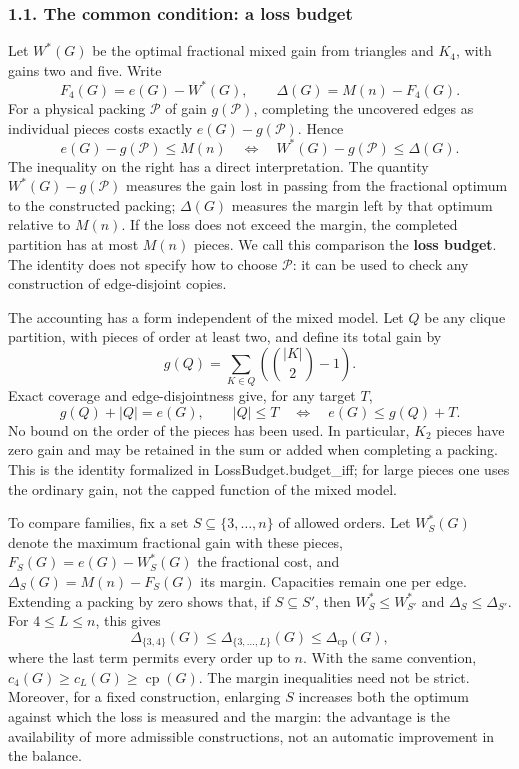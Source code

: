 \documentclass[english,11pt,a4paper]{article}
\begin{document}
\subsubsection{1.1. The common condition: a loss budget}\label{the-common-condition-a-loss-budget}

Let \(W^*(G)\) be the optimal fractional mixed gain from triangles and \(K_4\), with gains two and five. Write \[
F_4(G)=e(G)-W^*(G),\qquad \Delta(G)=M(n)-F_4(G).
\] For a physical packing \(\mathcal P\) of gain \(g(\mathcal P)\), completing the uncovered edges as individual pieces costs exactly \(e(G)-g(\mathcal P)\). Hence \[
\boxed{
e(G)-g(\mathcal P)\le M(n)
\quad\Longleftrightarrow\quad
W^*(G)-g(\mathcal P)\le\Delta(G).
}
\tag{1.3}
\] The inequality on the right has a direct interpretation. The quantity \(W^*(G)-g(\mathcal P)\) measures the gain lost in passing from the fractional optimum to the constructed packing; \(\Delta(G)\) measures the margin left by that optimum relative to \(M(n)\). If the loss does not exceed the margin, the completed partition has at most \(M(n)\) pieces. We call this comparison the \textbf{loss budget}. The identity does not specify how to choose \(\mathcal P\): it can be used to check any construction of edge-disjoint copies.

The accounting has a form independent of the mixed model. Let \(Q\) be any clique partition, with pieces of order at least two, and define its total gain by \[
g(Q)=\sum_{K\in Q}\left(\binom{|K|}{2}-1\right).
\] Exact coverage and edge-disjointness give, for any target \(T\), \[
g(Q)+|Q|=e(G),\qquad
|Q|\le T\quad\Longleftrightarrow\quad e(G)\le g(Q)+T.
\tag{1.3a}
\] No bound on the order of the pieces has been used. In particular, \(K_2\) pieces have zero gain and may be retained in the sum or added when completing a packing. This is the identity formalized in {\ttfamily\small LossBudget.\discretionary{\hbox{\ensuremath{\hookrightarrow}}}{}{}budget\_\discretionary{\hbox{\ensuremath{\hookrightarrow}}}{}{}iff}; for large pieces one uses the ordinary gain, not the capped function of the mixed model.

To compare families, fix a set \(S\subseteq\{3,\ldots,n\}\) of allowed orders. Let \(W_S^*(G)\) denote the maximum fractional gain with these pieces, \(F_S(G)=e(G)-W_S^*(G)\) the fractional cost, and \(\Delta_S(G)=M(n)-F_S(G)\) its margin. Capacities remain one per edge. Extending a packing by zero shows that, if \(S\subseteq S'\), then \(W_S^*\le W_{S'}^*\) and \(\Delta_S\le\Delta_{S'}\). For \(4\le L\le n\), this gives \[
\Delta_{\{3,4\}}(G)\le\Delta_{\{3,\ldots,L\}}(G)
\le\Delta_{\mathrm{cp}}(G),
\tag{1.3b}
\] where the last term permits every order up to \(n\). With the same convention, \(c_4(G)\ge c_L(G)\ge\operatorname{cp}(G)\). The margin inequalities need not be strict. Moreover, for a fixed construction, enlarging \(S\) increases both the optimum against which the loss is measured and the margin: the advantage is the availability of more admissible constructions, not an automatic improvement in the balance.
\end{document}
